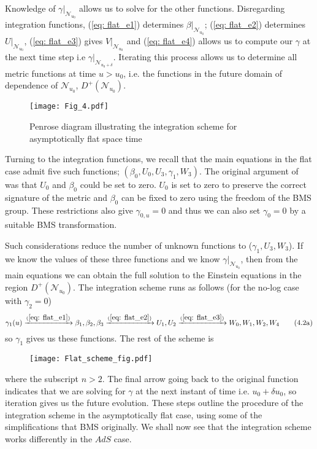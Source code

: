\documentclass[a4paper,11pt]{article}
\numberwithin{equation}{section}
\begin{document}
Knowledge of $\gamma |_{\mathcal{N}_{u_0}}$ allows us to solve for the other functions. Disregarding integration functions, (\ref{eq: flat_e1}) determines $\beta |_{\mathcal{N}_{u_0}}$; (\ref{eq: flat_e2}) determines $U |_{\mathcal{N}_{u_0}}$, (\ref{eq: flat_e3}) gives $V|_{\mathcal{N}_{u_0}}$ and (\ref{eq: flat_e4}) allows us to compute our $\gamma$ at the next time step i.e $\gamma  |_{\mathcal{N}_{u_0+\delta}}$. Iterating this process allows us to determine all metric functions at time $u > u_0$, i.e. the functions in the future domain of dependence of $\mathcal{N}_{u_0}$, $D^+(\mathcal{N}_{u_0})$.

\begin{figure}[h]
\begin{center}
\texttt{[image: Fig\_4.pdf]}
\end{center}
\caption{Penrose diagram illustrating the integration scheme for asymptotically flat space time}
\end{figure}

Turning to the integration functions, we recall that the main equations in the flat case admit five such functions; $(\beta_0, U_0, U_3, \gamma_1, W_3)$. The original argument of \cite{Bondi:1962px} was that $U_0$ and $\beta_0$ could be set to zero. $U_0$ is set to zero to preserve the correct signature of the metric and $\beta_0$ can be fixed to zero using the freedom of the BMS group. These restrictions also give $\gamma_{0,u}=0$ and thus we can also set $\gamma_0=0$ by a suitable BMS transformation. \par

Such considerations reduce the number of unknown functions to ($\gamma_1, U_3, W_3$). If we know the values of these three functions and we know $\gamma |_{\mathcal{N}_{u_0}}$, then from the main equations we can obtain the full solution to the Einstein equations in the region $D^+(\mathcal{N}_{u_0})$. The integration scheme runs as follows (for the no-log case with $\gamma_2=0$)
\begin{equation}
\gamma_1(u) \xrightarrow{(\ref{eq: flat_e1})} \beta_1, \beta_2, \beta_3 \xrightarrow{(\ref{eq: flat_e2})} U_1, U_2 \xrightarrow{(\ref{eq: flat_e3})} W_0, W_1, W_2, W_4  \tag{4.2a}
\end{equation} 
so $\gamma_1$ gives us these functions. The rest of the scheme is 

\begin{figure}
\begin{center}
\texttt{[image: Flat\_scheme\_fig.pdf]}
\end{center}
\end{figure}
where the subscript $n>2$. The final arrow going back to the original function indicates that we are solving for $\gamma$ at the next instant of time i.e. $u_0+\delta u_0$, so iteration gives us the future evolution. These steps outline the procedure of the integration scheme in the asymptotically flat case, using some of the simplifications that BMS originally. We shall now see that the integration scheme works differently in the $AdS$ case.  
\end{document}
